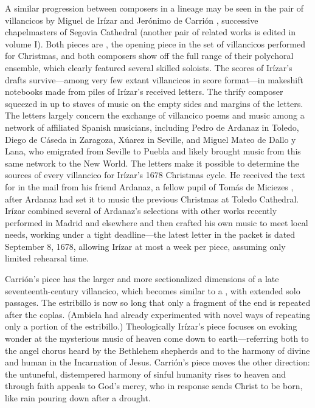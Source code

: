 A similar progression between composers in a lineage may be seen in the pair
of villancicos by Miguel de Irízar and Jerónimo de Carrión \XXX[dates],
successive chapelmasters of Segovia Cathedral (another pair of related works
is edited in volume I).
Both pieces are , the opening piece in the set of
villancicos performed for Christmas, and both composers show off the full
range of their polychoral ensemble, which clearly featured several skilled
soloists.
The scores of Irízar's drafts survive---among very few extant villancicos in
score format---in makeshift notebooks made from piles of Irízar's received
letters.
The thrify composer squeezed in up to \XXX[eleven] staves of music on the
empty sides and margins of the letters.
The letters largely concern the exchange of villancico poems and music among a
network of affiliated Spanish musicians, including Pedro de Ardanaz in Toledo,
Diego de Cáseda in Zaragoza, \XXX[Miguel] Xúarez in Seville, and Miguel Mateo
de Dallo y Lana, who emigrated from Seville to Puebla and likely brought music
from this same network to the New World.
The letters make it possible to determine the sources of every villancico for
Irízar's 1678 Christmas cycle.
He received the text for  in the mail from his
friend Ardanaz, a fellow pupil of Tomás de Miciezes \XXX[Sr?], after Ardanaz
had set it to music the previous Christmas at Toledo Cathedral.
Irízar combined several of Ardanaz's selections with other works recently
performed in Madrid and elsewhere and then crafted his own music to meet local
needs, working under a tight deadline---the latest letter in the packet is
dated September 8, 1678, allowing Irízar at most a week per piece, assuming
only limited rehearsal time.

Carrión's piece has the larger and more sectionalized dimensions of a late
seventeenth-century villancico, which becomes similar to a ,
with extended solo passages.
The estribillo is now so long that only a fragment of the end is repeated
after the coplas.
(Ambiela had already experimented with novel ways of repeating only a portion
of the estribillo.)
Theologically Irízar's piece focuses on evoking wonder at the mysterious music
of heaven come down to earth---referring both to the angel chorus heard by the
Bethlehem shepherds and to the harmony of divine and human in the Incarnation
of Jesus.
Carrión's piece moves the other direction: the untuneful, distempered harmony
of sinful humanity rises to heaven and through faith appeals to God's mercy,
who in response sends Christ to be born, like rain pouring down after a
drought.

